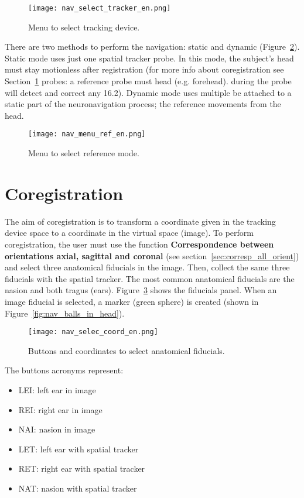 \begin{figure}[!htb]
\centering
\texttt{[image: nav\_select\_tracker\_en.png]}
\caption{Menu to select tracking device.}
\label{fig:nav_select_tracker}
\end{figure}

There are two methods to perform the navigation: static and dynamic (Figure~\ref{fig:nav_menu_ref}). Static mode uses just one spatial tracker probe. In this mode, the subject's head must stay motionless after registration (for more info about coregistration see Section~\ref{sec:corregistro} probes: a reference probe must head (e.g. forehead). during the probe will detect and correct any 16.2). Dynamic mode uses multiple be attached to a static part of the neuronavigation process; the reference movements from the head.

\begin{figure}[!htb]
\centering
\texttt{[image: nav\_menu\_ref\_en.png]}
\caption{Menu to select reference mode.}
\label{fig:nav_menu_ref}
\end{figure}

\section{Coregistration}
\label{sec:corregistro}

The aim of coregistration is to transform a coordinate given in the tracking device space to a coordinate in the virtual space (image). To perform coregistration, the user must use the function \textbf{Correspondence between orientations axial, sagittal and coronal} (see section~\ref{sec:corresp_all_orient}) and select three anatomical fiducials in the image. Then, collect the same three fiducials with the spatial tracker. The most common anatomical fiducials are the nasion and both tragus (ears). Figure~\ref{fig:nav_selec_coord} shows the fiducials panel. When an image fiducial is selected, a marker (green sphere) is created (shown in Figure~\ref{fig:nav_balls_in_head}).

\begin{figure}[!htb]
\centering
\texttt{[image: nav\_selec\_coord\_en.png]}
\caption{Buttons and coordinates to select anatomical fiducials.}
\label{fig:nav_selec_coord}
\end{figure}

The buttons acronyms represent:

\begin{itemize}
	\item LEI: left ear in image
	\item REI: right ear in image
	\item NAI: nasion in image
	\item LET: left ear with spatial tracker
	\item RET: right ear with spatial tracker
	\item NAT: nasion with spatial tracker
\end{itemize}

